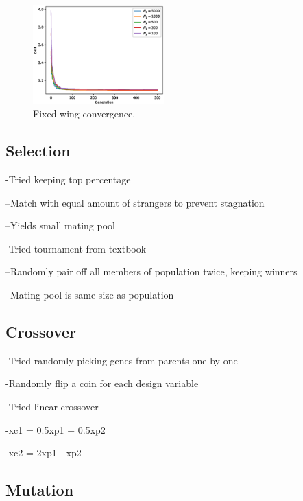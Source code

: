 \documentclass[letterpaper, 10 pt, conference]{ieeeconf}  %
\begin{document}

\begin{figure}[htbp]
	\centering
	\includegraphics[width=0.45\textwidth]{figures/fixedwing_convergence.eps}
	\caption{Fixed-wing convergence.}
	\label{fig:fw_convergence}
\end{figure}


\subsection{Selection}

-Tried keeping top percentage

--Match with equal amount of strangers to prevent stagnation

--Yields small mating pool

-Tried tournament from textbook

--Randomly pair off all members of population twice, keeping winners

--Mating pool is same size as population


\subsection{Crossover}

-Tried randomly picking genes from parents one by one

-Randomly flip a coin for each design variable

-Tried linear crossover

-xc1 = 0.5xp1 + 0.5xp2

-xc2 = 2xp1 - xp2


\subsection{Mutation}
\end{document}
